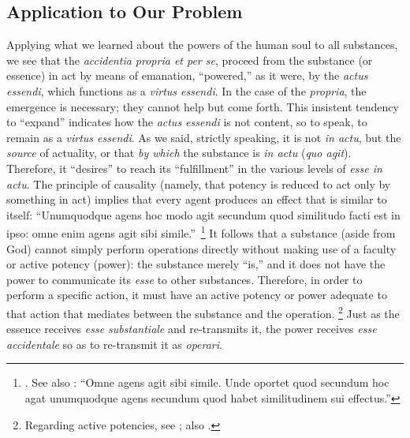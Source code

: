 \subsection{Application to Our Problem}

Applying what we learned about the powers of the human soul to all substances, we see that the \emph{accidentia propria et per se}, proceed from the substance (or essence) in act by means of emanation, ``powered,'' as it were, by the \emph{actus essendi}, which functions as a \emph{virtus essendi}. In the case of the \emph{propria}, the emergence is necessary; they cannot help but come forth. This insistent tendency to ``expand'' indicates how the \emph{actus essendi} is not content, so to speak, to remain as a \emph{virtus essendi}. As we said, strictly speaking, it is not \emph{in actu}, but the \emph{source} of actuality, or that \emph{by which} the substance is \emph{in actu} (\emph{quo agit}). Therefore, it ``desires'' to reach its ``fulfillment'' in the various levels of \emph{esse in actu}. The principle of causality (namely, that potency is reduced to act only by something in act) implies that every agent produces an effect that is similar to itself: ``Unumquodque agens hoc modo agit secundum quod similitudo facti est in ipso: omne enim agens agit sibi simile.''\,%
%
\footnote{\Cite[II, cap.~23, n.~4 (Marietti n.~992)]{st:contragent}. See also \cite[II, cap.~24, n.~3 (Marietti n.~1004)]{st:contragent}: ``Omne agens agit sibi simile. Unde oportet quod secundum hoc agat unumquodque agens secundum quod habet similitudinem sui effectus.''}
%
It follows that a substance (aside from God) cannot simply perform operations directly without making use of a faculty or active potency (power): the substance merely ``is,'' and it does not have the power to communicate its \emph{esse} to other substances. Therefore, in order to perform a specific action, it must have an active potency or power adequate to that action that mediates between the substance and the operation.%
%
\footnote{Regarding active potencies, see \cite[244--246]{definance:etre-et-agir}; also \cite[212--219]{izquierdo:vita}.}
%
Just as the essence receives \emph{esse substantiale} and re-transmits it, the power receives \emph{esse accidentale} so as to re-transmit it as   \emph{operari}.

